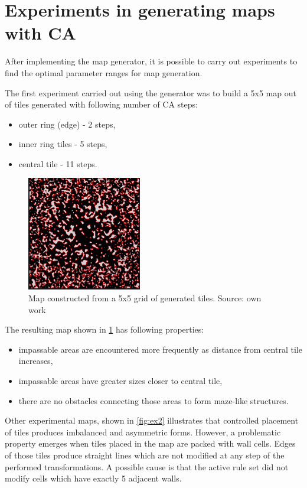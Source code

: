 \documentclass[12pt]{report}
\begin{document}
 
\section{Experiments in generating maps with CA}

After implementing the map generator, it is possible to carry out experiments to find the optimal parameter ranges for map generation.

The first experiment carried out using the generator was to build a 5x5 map out of tiles generated with following number of CA steps:

\begin{itemize}
	\item outer ring (edge) - 2 steps,
	\item inner ring tiles - 5 steps,
	\item central tile - 11 steps.
\end{itemize}

 \begin{figure}[H]
	\centering
	\includegraphics[height=5cm]{images/ex1}
	\caption{Map constructed from a 5x5 grid of generated tiles. Source: own work}
	\label{fig:ex1}
\end{figure}

The resulting map shown in \cref{fig:ex1} has following properties:
\begin{itemize}
	\item impassable areas are encountered more frequently as distance from central tile increases,
	\item impassable areas have greater sizes closer to central tile,
	\item there are no obstacles connecting those areas to form maze-like structures.
\end{itemize} 
 
Other experimental maps, shown in \cref{fig:ex2} illustrates that controlled placement of tiles produces imbalanced and asymmetric forms. However, a problematic property emerges when tiles placed in the map are packed with wall cells. Edges of those tiles produce straight lines which are not modified at any step of the performed transformations. A possible cause is that the active rule set did not modify cells which have exactly 5 adjacent walls.
\end{document}
